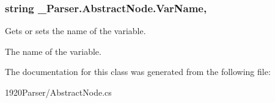 \subsubsection[{\texorpdfstring{Var\+Name}{VarName}}]{\setlength{\rightskip}{0pt plus 5cm}string \+\_\+Parser.\+Abstract\+Node.\+Var\+Name\hspace{0.3cm}{\ttfamily [get]}, {}}\hypertarget{class__1920_parser_1_1_abstract_node_ae4a8076d5cf940c9fa0b1a7fecdd4a6a}{}\label{class__1920_parser_1_1_abstract_node_ae4a8076d5cf940c9fa0b1a7fecdd4a6a}


Gets or sets the name of the variable. 

The name of the variable. 

The documentation for this class was generated from the following file\+:\begin{DoxyCompactItemize}
\item 
1920\+Parser/Abstract\+Node.\+cs\end{DoxyCompactItemize}

